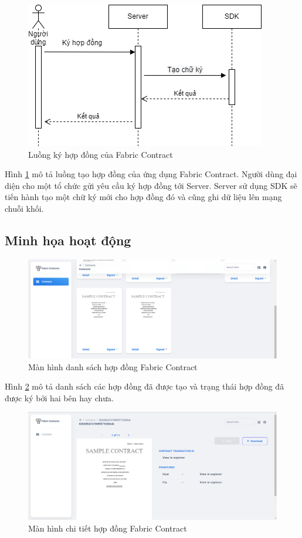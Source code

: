 \documentclass[../DoAn.tex]{subfiles}
\begin{document}
\begin{figure}[H]
    \centering
    \includegraphics[width=0.75\linewidth]{Hinhve/DoAn-SeqSignContract.drawio.png}
    \caption{Luồng ký hợp đồng của Fabric Contract}
    \label{fig:SeqSignContract}
\end{figure}

Hình \ref{fig:SeqSignContract} mô tả luồng tạo hợp đồng của ứng dụng Fabric
Contract. Người dùng đại diện cho một tổ chức gửi yêu cầu ký hợp đồng tới
Server. Server sử dụng SDK sẽ tiến hành tạo một chữ ký mới cho hợp đồng đó và
cũng ghi dữ liệu lên mạng chuỗi khối.

\subsection{Minh họa hoạt động}

\begin{figure}[H]
    \centering
    \includegraphics[width=0.75\linewidth]{Hinhve/DoAn-ScreenContracts.png}
    \caption{Màn hình danh sách hợp đồng Fabric Contract}
    \label{fig:ScreenContracts}
\end{figure}

Hình \ref{fig:ScreenContracts} mô tả danh sách các hợp đồng đã được tạo và
trạng thái hợp đồng đã được ký bởi hai bên hay chưa.

\begin{figure}[H]
    \centering
    \includegraphics[width=0.75\linewidth]{Hinhve/DoAn-ScreenContractDetail.png}
    \caption{Màn hình chi tiết hợp đồng Fabric Contract}
    \label{fig:ScreenContractDetail}
\end{figure}
\end{document}
